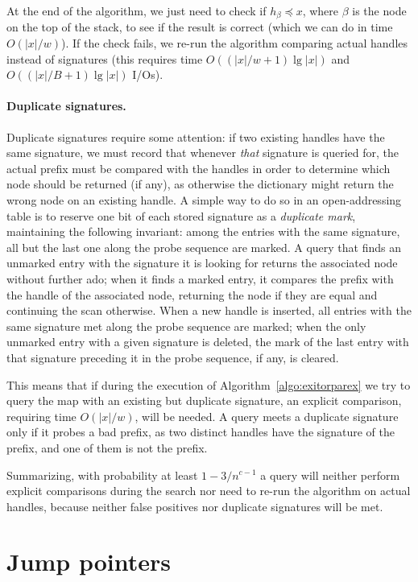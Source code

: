 \documentclass[a4paper]{article}
\newcommand{\?}{\mskip1.5mu}
\begin{document}
At the end of the algorithm, we just need to check if $h_\beta\preceq x$, where $\beta$ is the node
on the top of the stack,
to see if the result is correct (which we can do in time $O(|x|/w)$). 
If the check fails, we re-run the algorithm comparing actual handles
instead of signatures (this requires time
$O((|x|/w+1)\lg|x|)$ and $O((|x|/B+1)\lg|x|)$ I/Os). 

\paragraph{Duplicate signatures.} 
Duplicate signatures require some attention: if two existing handles have the same signature, we must
record that whenever \emph{that} signature is queried for, the actual prefix must be compared with the handles in order to determine
which node should be returned (if any), as otherwise the dictionary might return the wrong node on an existing handle. 
A simple way to do so in an open-addressing table is to reserve one bit of each stored signature as a \emph{duplicate mark},
maintaining the following invariant: among the entries with the same signature, all but the last one along the
probe sequence are marked. A query that finds an unmarked entry with the signature it is looking for returns the associated node
without further ado; when it finds a marked entry, it compares the prefix with the handle of the associated node, 
returning the node if they are equal and continuing the scan otherwise. When a new handle is inserted, all 
entries with the same signature met along the probe sequence are marked; when the only unmarked entry with a given signature is deleted, the 
mark of the last entry with that signature preceding it in the probe sequence, if any, is cleared.

This means that if during the execution of Algorithm~\ref{algo:exitorparex} we try to query the map with an
existing but duplicate signature, an explicit comparison, requiring time $O(|x|/w)$, will be needed. A query meets
a duplicate signature only if it probes a bad prefix, as two distinct handles have the signature of the prefix, and
one of them is not the prefix.

\smallskip
Summarizing, with probability at least $1-3/n^{c-1}$ a query will neither perform explicit comparisons
during the search nor need to re-run the algorithm on actual handles,
because neither false positives nor duplicate signatures will be met. 


\section{Jump pointers}
\label{sec:jumppointers}
\end{document}
